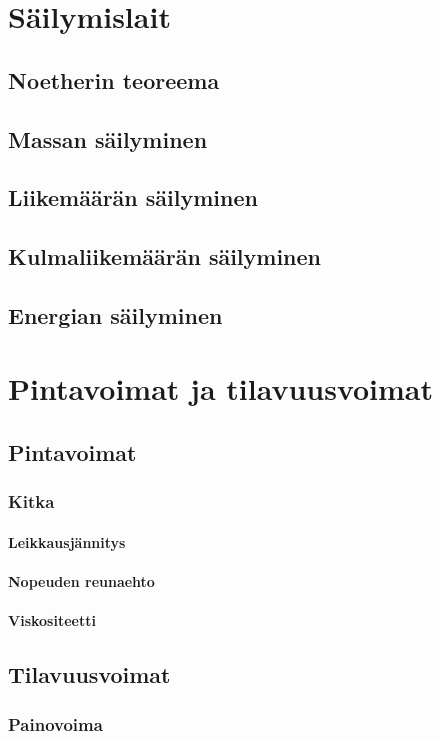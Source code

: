 \documentclass[12pt,a4paper,finnish]{book}
\begin{document}
\chapter{Säilymislait}
\section{Noetherin teoreema}
\section{Massan säilyminen}
\section{Liikemäärän säilyminen}
\section{Kulmaliikemäärän säilyminen}
\section{Energian säilyminen}

\chapter{Pintavoimat ja tilavuusvoimat}
\section{Pintavoimat}
\subsection{Kitka}
\subsubsection{Leikkausjännitys}
\subsubsection{Nopeuden reunaehto}
\subsubsection{Viskositeetti}
\section{Tilavuusvoimat}
\subsection{Painovoima}
\end{document}
